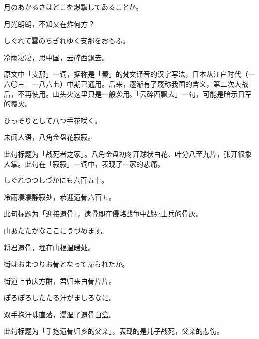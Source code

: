 \begin{haiku}
    {\FH 月のあかるさはどこを爆撃してゐることか。}

    {\FK 月光朗朗，不知又在炸何方？}
\end{haiku}

\begin{haiku}
    {\FH しぐれて雲のちぎれゆく支那をおもふ。}

    {\FK 冷雨凄凄，思中国，云碎西飘去。}

    {\FS 原文中「支那」一词，据称是「秦」的梵文译音的汉字写法，日本从江户时代（一六〇三—一八六七）中期已通用。后来，逐渐有了蔑称我国的含义，第二次大战后，不再使用。山头火这里只是一般袭用。「云碎西飘去」一句，可能是暗示日军的覆灭。}
\end{haiku}

\begin{haiku}
    {\FH ひっそりとして八つ手花咲く。}

    {\FK 未闻人语，八角金盘花寂寂。}

    {\FS 此句标题为「战死者之家」。八角金盘初冬开球状白花、叶分八至九片，张开很象人掌。此句在「寂寂」一词中，表现了一家的悲痛。}
\end{haiku}

\begin{haiku}
    {\FH しぐれつつしづかにも六百五十。}

    {\FK 冷雨凄凄静寂处，恭迎遗骨六百五。}

    {\FS 此句标题为「迎接遗骨」，遗骨即在侵略战争中战死士兵的骨灰。}
\end{haiku}

\begin{haiku}
    {\FH 山あたたかなここにうづめます。}

    {\FK 将君遗骨，埋在山根温暖处。}
\end{haiku}

\begin{haiku}
    {\FH 街はおまつりお骨となって帰られたか。}

    {\FK 街道上节庆方酣，君归来白骨片片。}
\end{haiku}

\begin{haiku}
    {\FH ぽろぽろしたたる汗がましろなに。}

    {\FK 双手抱汗珠直落，濡湿了遗骨白盒。}

    {\FS 此句标题为「手抱遗骨归乡的父亲」，表现的是儿子战死，父亲的悲伤。}
\end{haiku}

